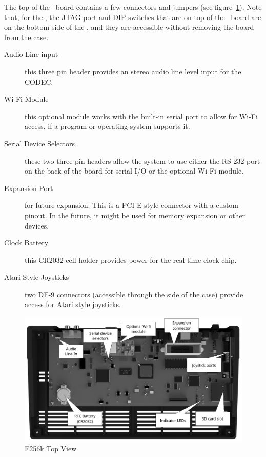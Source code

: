 The top of the \fk\ board contains a few connectors and jumpers (see figure~\ref{fig:top_k}). Note that, for the \fk, the JTAG port and DIP switches that are on top of the \fjr\ board are on the bottom side of the \fk, and they are accessible without removing the board from the case.

\begin{description}
    \item[Audio Line-input] this three pin header provides an stereo audio line level input for the CODEC.
    
    \item[Wi-Fi Module] this optional module works with the built-in serial port to allow for Wi-Fi access, if a program or operating system supports it.

    \item[Serial Device Selectors] these two three pin headers allow the system to use either the RS-232 port on the back of the board for serial I/O or the optional Wi-Fi module.

    \item[Expansion Port] for future expansion. This is a PCI-E style connector with a custom pinout. In the future, it might be used for memory expansion or other devices.

    \item[Clock Battery] this CR2032 cell holder provides power for the real time clock chip.
    
    \item[Atari Style Joysticks] two DE-9 connectors (accessible through the side of the case) provide access for Atari style joysticks.
   \end{description}

\begin{figure}[ht]
    \begin{center}
        \includegraphics[scale=0.55]{images/f256k_top_annotated.pdf}
    \end{center}
    \caption{F256k Top View}
    \label{fig:top_k}
\end{figure}

